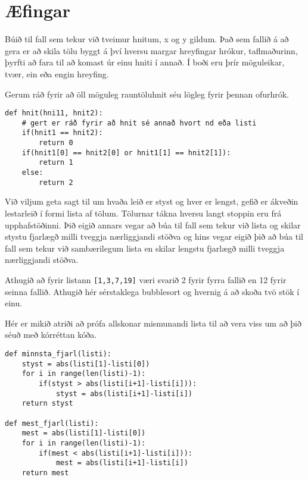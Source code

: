 \section{Æfingar}
\begin{exercise}\label{rei1}
Búið til fall sem tekur við tveimur hnitum, x og y gildum.
Það sem fallið á að gera er að skila tölu byggt á því hversu margar hreyfingar hrókur, taflmaðurinn, þyrfti að fara til að komast úr einu hniti í annað.
Í boði eru þrír möguleikar, tvær, ein eða engin hreyfing.

Gerum ráð fyrir að öll möguleg rauntöluhnit séu lögleg fyrir þennan ofurhrók.
\end{exercise}
\begin{Answer}[ref={rei1}]
	\begin{lstlisting}
def hnit(hni11, hnit2):
	# gert er ráð fyrir að hnit sé annað hvort nd eða listi
	if(hnit1 == hnit2):
		return 0
	if(hnit1[0] == hnit2[0] or hnit1[1] == hnit2[1]):
		return 1
	else:
		return 2\end{lstlisting}
\end{Answer}

\begin{exercise}\label{rei2}
Við viljum geta sagt til um hvaða leið er styst og hver er lengst, gefið er ákveðin lestarleið í formi lista af tölum.
Tölurnar tákna hversu langt stoppin eru frá upphafstöðinni.
Þið eigið annars vegar að búa til fall sem tekur við lista og skilar stystu fjarlægð milli tveggja nærliggjandi stöðva og hins vegar eigið þið að búa til fall sem tekur við sambærilegum lista en skilar lengstu fjarlægð milli tveggja nærliggjandi stöðva.

Athugið að fyrir listann \texttt{[1,3,7,19]} væri svarið 2 fyrir fyrra fallið en 12 fyrir seinna fallið.
Athugið hér sérstaklega bubblesort og hvernig á að skoða tvö stök í einu.
\end{exercise}
\begin{Answer}[ref={rei2}]
Hér er mikið atriði að prófa allskonar mismunandi lista til að vera viss um að þið séuð með kórréttan kóða.
	\begin{lstlisting}
def minnsta_fjarl(listi):
	styst = abs(listi[1]-listi[0])
	for i in range(len(listi)-1):
		if(styst > abs(listi[i+1]-listi[i])):
			styst = abs(listi[i+1]-listi[i])
	return styst

def mest_fjarl(listi):
	mest = abs(listi[1]-listi[0])
	for i in range(len(listi)-1):
		if(mest < abs(listi[i+1]-listi[i])):
			mest = abs(listi[i+1]-listi[i])
	return mest

\end{lstlisting}
\end{Answer}

